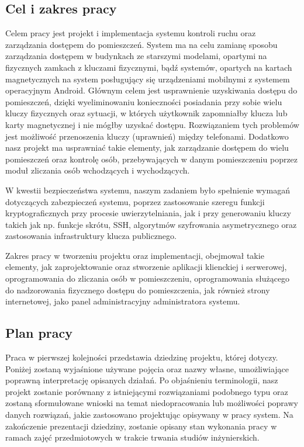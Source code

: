 \documentclass[twoside,10pt]{article}
\begin{document}
\subsection{Cel i zakres pracy}

Celem pracy jest projekt i implementacja systemu kontroli ruchu oraz zarządzania dostępem do pomieszczeń. System ma na celu zamianę sposobu zarządzania dostępem w budynkach ze starszymi modelami, opartymi na fizycznych zamkach z kluczami fizycznymi, bądź systemów, opartych na kartach magnetycznych na system posługujący się urządzeniami mobilnymi z systemem operacyjnym Android. Głównym celem jest usprawnienie uzyskiwania  dostępu do pomieszczeń, dzięki wyeliminowaniu konieczności posiadania przy sobie wielu kluczy fizycznych oraz sytuacji, w których użytkownik zapomniałby klucza lub karty magnetycznej i nie mógłby uzyskać dostępu. Rozwiązaniem tych problemów jest możliwość przenoszenia kluczy (uprawnień) między telefonami. 
Dodatkowo nasz projekt ma usprawniać takie elementy, jak zarządzanie dostępem do wielu pomieszczeń oraz kontrolę osób, przebywających w danym pomieszczeniu poprzez moduł zliczania osób wchodzących i wychodzących.

W kwestii bezpieczeństwa systemu, naszym zadaniem było spełnienie wymagań dotyczących zabezpieczeń systemu, poprzez zastosowanie szeregu funkcji kryptograficznych przy procesie uwierzytelniania, jak i przy generowaniu kluczy takich jak np. funkcje skrótu, SSH, algorytmów szyfrowania asymetrycznego oraz zastosowania infrastruktury klucza publicznego.

Zakres pracy w tworzeniu projektu oraz implementacji, obejmował takie elementy, jak zaprojektowanie oraz stworzenie aplikacji klienckiej i serwerowej, oprogramowania do zliczania osób w pomieszczeniu, oprogramowania służącego do nadzorowania fizycznego dostępu do pomieszczenia, jak również strony internetowej, jako panel administracyjny administratora systemu.

\newpage
\subsection{Plan pracy}
Praca w pierwszej kolejności przedstawia dziedzinę projektu, której dotyczy. Poniżej zostaną wyjaśnione używane pojęcia oraz nazwy własne, umożliwiające poprawną interpretację opisanych działań. Po objaśnieniu terminologii, nasz projekt zostanie porównany z istniejącymi rozwiązaniami podobnego typu oraz zostaną sformułowane wnioski na temat niedopracowania lub możliwości poprawy danych rozwiązań, jakie zastosowano projektując opisywany w pracy system. Na zakończenie prezentacji dziedziny, zostanie opisany stan wykonania pracy w ramach zajęć przedmiotowych w trakcie trwania studiów inżynierskich.
\end{document}
